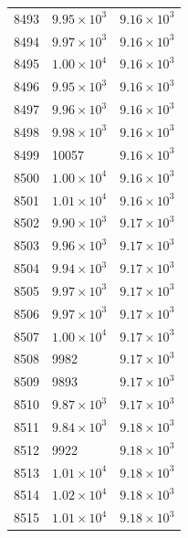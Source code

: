 \begin{table}[H]
\begin{tabular}{lll}
8493 & $\displaystyle 9.95 \times 10^{3}$ & $\displaystyle 9.16 \times 10^{3}$ \\
8494 & $\displaystyle 9.97 \times 10^{3}$ & $\displaystyle 9.16 \times 10^{3}$ \\
8495 & $\displaystyle 1.00 \times 10^{4}$ & $\displaystyle 9.16 \times 10^{3}$ \\
8496 & $\displaystyle 9.95 \times 10^{3}$ & $\displaystyle 9.16 \times 10^{3}$ \\
8497 & $\displaystyle 9.96 \times 10^{3}$ & $\displaystyle 9.16 \times 10^{3}$ \\
8498 & $\displaystyle 9.98 \times 10^{3}$ & $\displaystyle 9.16 \times 10^{3}$ \\
8499 & 10057 & $\displaystyle 9.16 \times 10^{3}$ \\
8500 & $\displaystyle 1.00 \times 10^{4}$ & $\displaystyle 9.16 \times 10^{3}$ \\
8501 & $\displaystyle 1.01 \times 10^{4}$ & $\displaystyle 9.16 \times 10^{3}$ \\
8502 & $\displaystyle 9.90 \times 10^{3}$ & $\displaystyle 9.17 \times 10^{3}$ \\
8503 & $\displaystyle 9.96 \times 10^{3}$ & $\displaystyle 9.17 \times 10^{3}$ \\
8504 & $\displaystyle 9.94 \times 10^{3}$ & $\displaystyle 9.17 \times 10^{3}$ \\
8505 & $\displaystyle 9.97 \times 10^{3}$ & $\displaystyle 9.17 \times 10^{3}$ \\
8506 & $\displaystyle 9.97 \times 10^{3}$ & $\displaystyle 9.17 \times 10^{3}$ \\
8507 & $\displaystyle 1.00 \times 10^{4}$ & $\displaystyle 9.17 \times 10^{3}$ \\
8508 & 9982 & $\displaystyle 9.17 \times 10^{3}$ \\
8509 & 9893 & $\displaystyle 9.17 \times 10^{3}$ \\
8510 & $\displaystyle 9.87 \times 10^{3}$ & $\displaystyle 9.17 \times 10^{3}$ \\
8511 & $\displaystyle 9.84 \times 10^{3}$ & $\displaystyle 9.18 \times 10^{3}$ \\
8512 & 9922 & $\displaystyle 9.18 \times 10^{3}$ \\
8513 & $\displaystyle 1.01 \times 10^{4}$ & $\displaystyle 9.18 \times 10^{3}$ \\
8514 & $\displaystyle 1.02 \times 10^{4}$ & $\displaystyle 9.18 \times 10^{3}$ \\
8515 & $\displaystyle 1.01 \times 10^{4}$ & $\displaystyle 9.18 \times 10^{3}$ \\

\end{tabular}
\end{table}
